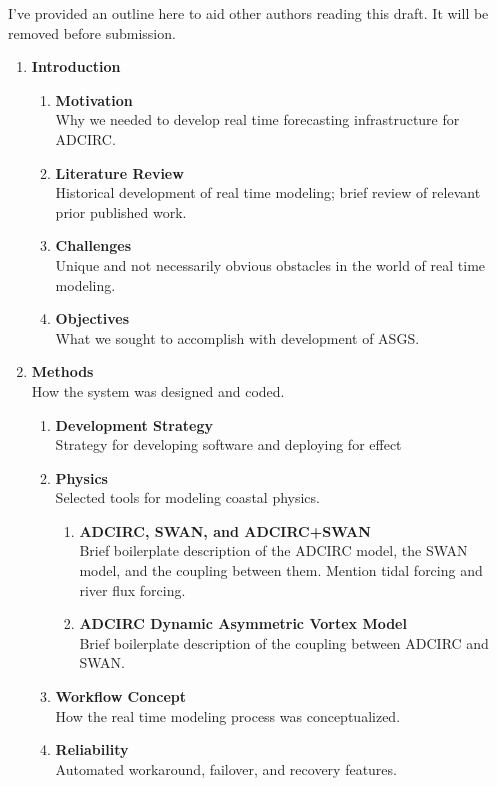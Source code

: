 \documentclass[12pt]{article}
\begin{document}
I've provided an outline here to aid other authors reading this draft.
It will be removed before submission. 

\begin{enumerate}
\item \textbf{Introduction} 
\begin{enumerate}
\item \textbf{Motivation} \\
Why we needed to develop real time forecasting infrastructure for ADCIRC.
\item \textbf{Literature Review} \\
Historical development of real time modeling; brief review of relevant prior published work.
\item \textbf{Challenges} \\
Unique and not necessarily obvious obstacles in the world of real time modeling.
\item \textbf{Objectives} \\
What we sought to accomplish with development of ASGS.
\end{enumerate}
\item \textbf{Methods} \\
How the system was designed and coded.
\begin{enumerate}
\item \textbf{Development Strategy} \\
Strategy for developing software and deploying for effect
\item \textbf{Physics} \\
Selected tools for modeling coastal physics.
\begin{enumerate}
\item \textbf{ADCIRC, SWAN, and ADCIRC+SWAN} \\
Brief boilerplate description of the ADCIRC model, the SWAN model,
and the coupling between them. Mention tidal forcing and river
flux forcing. 
\item \textbf{ADCIRC Dynamic Asymmetric Vortex Model} \\
Brief boilerplate description of the coupling between ADCIRC and SWAN.
\end{enumerate}
\item \textbf{Workflow Concept} \\
How the real time modeling process was conceptualized. 
\item \textbf{Reliability} \\
Automated workaround, failover, and recovery features. 

\end{enumerate}
\end{enumerate}
\end{document}
